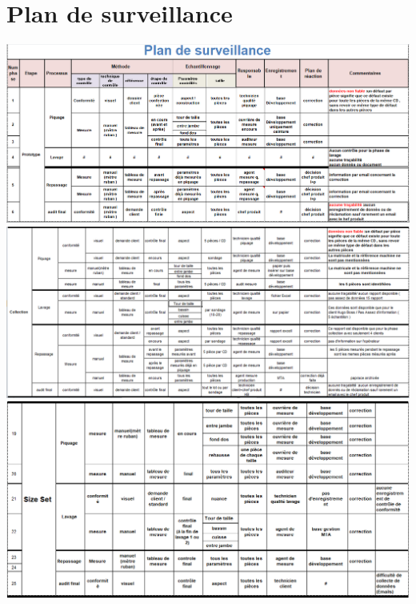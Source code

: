 \documentclass[12pt, a4paper]{thesis}
\begin{document}
 

 
 

\section{Plan de surveillance}
\label{nour111}
 \includegraphics[scale=0.775 , angle=90]{ssss.PNG}\\
 \includegraphics[scale=0.775 , angle=90]{see.PNG}\\
  \includegraphics[scale=0.85 , angle=90]{plz.PNG}
  
  
\begin{center}
    


\label{nour1111} 


\end{center}
\end{document}

